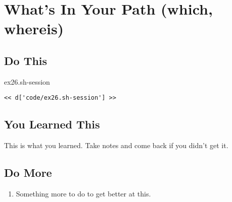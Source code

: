 \chapter{What's In Your Path (which, whereis)}

\section{Do This}

\begin{code}{ex26.sh-session}
\begin{Verbatim}
<< d['code/ex26.sh-session'] >>
\end{Verbatim}
\end{code}


\section{You Learned This}

This is what you learned.  Take notes and come back if you didn't get it.

\section{Do More}

\begin{enumerate}
\item Something more to do to get better at this.
\end{enumerate}

